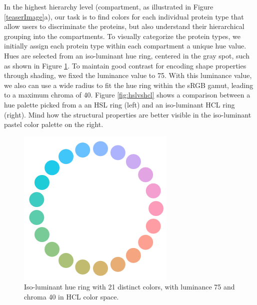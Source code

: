 \documentclass{egpubl}
\begin{document}
	In the highest hierarchy level (compartment, as illustrated in Figure \ref{teaserImage}a), our task is to find colors for each individual protein type that allow users to discriminate the proteins, but also understand their hierarchical grouping into the compartments. 
	To visually categorize the protein types, we initially assign each protein type within each compartment a unique hue value. 
	Hues are selected from an iso-luminant hue ring, centered in the gray spot, such as shown in Figure \ref{fig:hueWheel}. 
	To maintain good contrast for encoding shape properties through shading, we fixed the luminance value to 75. 
	With this luminance value, we also can use a wide radius to fit the hue ring within the sRGB gamut, leading to a maximum chroma of 40. 
	Figure \ref{fig:hslvshcl} shows a comparison between a hue palette picked from a an HSL ring (left) and an iso-luminant HCL ring (right). 
	Mind how the structural properties are better visible in the iso-luminant pastel color palette on the right. 
	
	\begin{figure}
\centering
\includegraphics[width=0.3\linewidth]{Figures/hueWheel.png}
\caption{Iso-luminant hue ring with 21 distinct colors, with luminance 75 and chroma 40 in HCL color space.}
\label{fig:hueWheel}
\end{figure}
\end{document}
